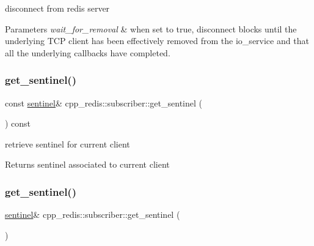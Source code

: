 disconnect from redis server 


\begin{DoxyParams}{Parameters}
{\em wait\+\_\+for\+\_\+removal} & when set to true, disconnect blocks until the underlying T\+CP client has been effectively removed from the io\+\_\+service and that all the underlying callbacks have completed. \\
\hline
\end{DoxyParams}
\mbox{\label{classcpp__redis_1_1subscriber_a0a6212dfba0513508fdc6377f83a0048}} 
\subsubsection{\texorpdfstring{get\+\_\+sentinel()}{get\_sentinel()}\hspace{0.1cm}{\footnotesize\ttfamily [1/2]}}
{\footnotesize\ttfamily const \mbox{\hyperlink{classcpp__redis_1_1sentinel}{sentinel}}\& cpp\+\_\+redis\+::subscriber\+::get\+\_\+sentinel (\begin{DoxyParamCaption}{ }\end{DoxyParamCaption}) const}

retrieve sentinel for current client

\begin{DoxyReturn}{Returns}
sentinel associated to current client 
\end{DoxyReturn}
\mbox{\label{classcpp__redis_1_1subscriber_a4a77354e12a6ef19cad7b0f55b62033c}} 
\subsubsection{\texorpdfstring{get\+\_\+sentinel()}{get\_sentinel()}\hspace{0.1cm}{\footnotesize\ttfamily [2/2]}}
{\footnotesize\ttfamily \mbox{\hyperlink{classcpp__redis_1_1sentinel}{sentinel}}\& cpp\+\_\+redis\+::subscriber\+::get\+\_\+sentinel (\begin{DoxyParamCaption}{ }\end{DoxyParamCaption})}

